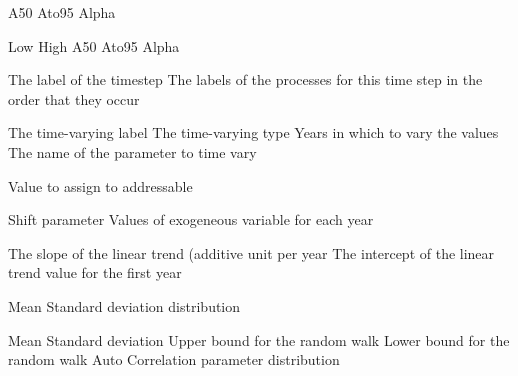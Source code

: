  {A50}
 {Ato95}
 {Alpha}
\par\textbf{}\par
{} {Low}
 {High}
 {A50}
 {Ato95}
 {Alpha}
\par\par
{} {The label of the timestep}
 {The labels of the processes for this time step in the order that they occur}
\par\par
{} {The time-varying label}
 {The time-varying type}
 {Years in which to vary the values}
 {The name of the parameter to time vary}
\par\textbf{}\par
{} {}
 {}
 {}
 {}
 {}
\par\textbf{}\par
{} {Value to assign to addressable}
\par\textbf{}\par
{} {Shift parameter}
 {Values of exogeneous variable for each year}
\par\textbf{}\par
{} {The slope of the linear trend (additive unit per year}
 {The intercept of the linear trend value for the first year}
\par\textbf{}\par
{} {Mean}
 {Standard deviation}
 {distribution}
\par\textbf{}\par
{} {Mean}
 {Standard deviation}
 {Upper bound for the random walk}
 {Lower bound for the random walk}
 {Auto Correlation parameter}
 {distribution}
